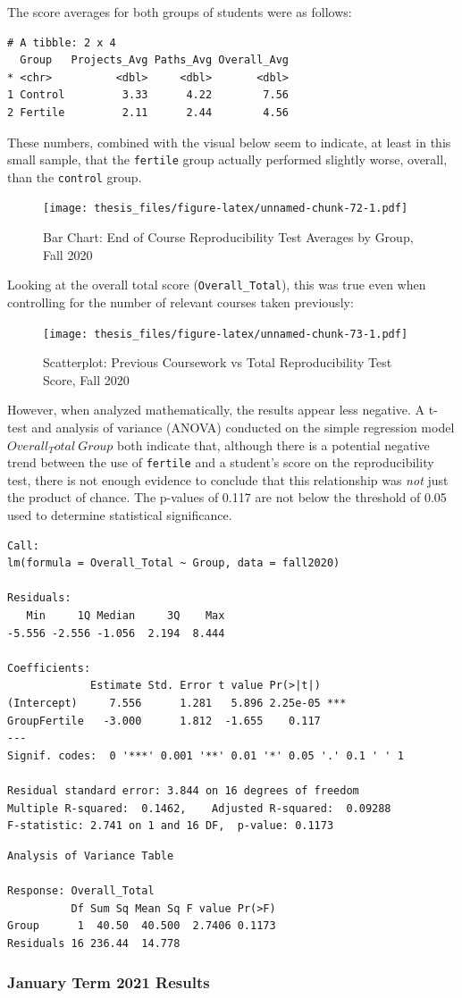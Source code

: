 \documentclass[12pt,twoside]{reedthesis}
\begin{document}
The score averages for both groups of students were as follows:
\begin{verbatim}
# A tibble: 2 x 4
  Group   Projects_Avg Paths_Avg Overall_Avg
* <chr>          <dbl>     <dbl>       <dbl>
1 Control         3.33      4.22        7.56
2 Fertile         2.11      2.44        4.56
\end{verbatim}
These numbers, combined with the visual below seem to indicate, at least in this small sample, that the \texttt{fertile} group actually performed slightly worse, overall, than the \texttt{control} group.
\begin{figure}
\centering
\texttt{[image: thesis\_files/figure-latex/unnamed-chunk-72-1.pdf]}
\caption{\label{fig:unnamed-chunk-72}Bar Chart: End of Course Reproducibility Test Averages by Group, Fall 2020}
\end{figure}
Looking at the overall total score (\texttt{Overall\_Total}), this was true even when controlling for the number of relevant courses taken previously:
\begin{figure}
\centering
\texttt{[image: thesis\_files/figure-latex/unnamed-chunk-73-1.pdf]}
\caption{\label{fig:unnamed-chunk-73}Scatterplot: Previous Coursework vs Total Reproducibility Test Score, Fall 2020}
\end{figure}
However, when analyzed mathematically, the results appear less negative. A t-test and analysis of variance (ANOVA) conducted on the simple regression model \(Overall_Total ~ Group\) both indicate that, although there is a potential negative trend between the use of \texttt{fertile} and a student's score on the reproducibility test, there is not enough evidence to conclude that this relationship was \emph{not} just the product of chance. The p-values of 0.117 are not below the threshold of 0.05 used to determine statistical significance.
\begin{verbatim}
Call:
lm(formula = Overall_Total ~ Group, data = fall2020)

Residuals:
   Min     1Q Median     3Q    Max 
-5.556 -2.556 -1.056  2.194  8.444 

Coefficients:
             Estimate Std. Error t value Pr(>|t|)    
(Intercept)     7.556      1.281   5.896 2.25e-05 ***
GroupFertile   -3.000      1.812  -1.655    0.117    
---
Signif. codes:  0 '***' 0.001 '**' 0.01 '*' 0.05 '.' 0.1 ' ' 1

Residual standard error: 3.844 on 16 degrees of freedom
Multiple R-squared:  0.1462,    Adjusted R-squared:  0.09288 
F-statistic: 2.741 on 1 and 16 DF,  p-value: 0.1173
\end{verbatim}
\begin{verbatim}
Analysis of Variance Table

Response: Overall_Total
          Df Sum Sq Mean Sq F value Pr(>F)
Group      1  40.50  40.500  2.7406 0.1173
Residuals 16 236.44  14.778               
\end{verbatim}
\hypertarget{january-term-2021-results}{%
\subsubsection{January Term 2021 Results}\label{january-term-2021-results}}
\end{document}
